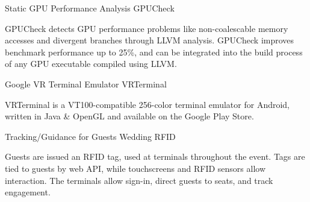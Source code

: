 
\begin{cventries}
    \cventry
        {Static GPU Performance Analysis} %
        {GPUCheck} %
        {} %
        {} %
        {
            \parbox[t]{8.5cm}{GPUCheck detects GPU performance problems like non-coalescable memory accesses and divergent branches through LLVM analysis.
            GPUCheck improves benchmark performance up to 25\%, and
            can be integrated into the build process of any GPU executable compiled using LLVM.
        }}
    \vspace{4mm}
    \cventry
        {Google VR Terminal Emulator} %
        {VRTerminal} %
        {} %
        {} %
        {\parbox[t]{8.5cm}{
            VRTerminal is a VT100-compatible 256-color terminal emulator for Android,
            written in Java \& OpenGL and available on the Google Play Store.
        }}
    \vspace{4mm}
    \cventry
        {Tracking/Guidance for Guests} %
        {Wedding RFID} %
        {} %
        {} %
        {\parbox[t]{8.5cm}{
            Guests are issued an RFID tag, used at terminals throughout the event.
            Tags are tied to guests by web API, while touchscreens and RFID sensors allow interaction.
            The terminals allow sign-in, direct guests to seats, and track engagement.
        }}
\end{cventries}
